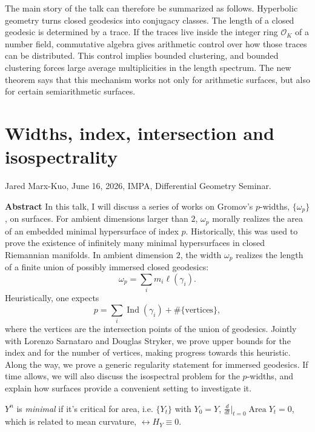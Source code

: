 \medskip\noindent
The main story of the talk can therefore be
summarized as follows. Hyperbolic geometry
turns closed geodesics into conjugacy classes.
The length of a closed geodesic is determined
by a trace. If the traces live inside the
integer ring $\mathcal{O}_K$ of a number
field, commutative algebra gives arithmetic
control over how those traces can be
distributed. This control implies bounded
clustering, and bounded clustering forces
large average multiplicities in the length
spectrum. The new theorem says that this
mechanism works not only for arithmetic
surfaces, but also for certain
semiarithmetic surfaces.

\section{Widths, index, intersection
and isospectrality}
\label{section-widths-index-intersection}

\noindent
Jared Marx-Kuo, June 16, 2026,
IMPA, Differential Geometry Seminar.

\medskip\noindent
{\bf Abstract}
In this talk, I will discuss a series of
works on Gromov's $p$-widths,
$\{\omega_p\}$, on surfaces.
For ambient dimensions larger than $2$,
$\omega_p$ morally realizes the area of
an embedded minimal hypersurface of
index $p$. Historically, this was used
to prove the existence of infinitely
many minimal hypersurfaces in closed
Riemannian manifolds.
In ambient dimension $2$, the width
$\omega_p$ realizes the length of a
finite union of possibly immersed
closed geodesics:
$$
\omega_p
=
\sum_i m_i \ell(\gamma_i).
$$
Heuristically, one expects
$$
p
=
\sum_i \operatorname{Ind}(\gamma_i)
+
\#\{\text{vertices}\},
$$
where the vertices are the intersection
points of the union of geodesics.
Jointly with Lorenzo Sarnataro and
Douglas Stryker, we prove upper bounds
for the index and for the number of
vertices, making progress towards this
heuristic. Along the way, we prove a
generic regularity statement for
immersed geodesics.
If time allows, we will also discuss
the isospectral problem for the
$p$-widths, and explain how surfaces
provide a convenient setting to
investigate it.



\begin{definition}
\label{definition-minimal-hypersurface}
$Y^n$ is {\it minimal} if it's critical
for area, i.e. $\{Y_t\}$ with $Y_0=Y$,
$\frac{d}{dt}\Big|_{t=0}\operatorname{Area}
Y_t=0$, which is related to mean curvature,
$\leftrightarrow H_Y \equiv0$.
\end{definition}

